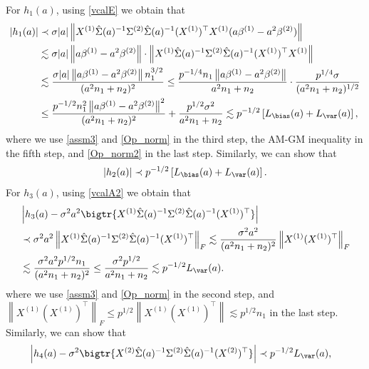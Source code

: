 \documentclass[aos,preprint]{imsart}
\begin{document}
For $h_1(a)$, using \eqref{vcalE} we obtain that 
\begin{align}
	 \left|h_1(a) \right| &\prec  \sigma |a|  \left\|  X^{(1)} \hat \Sigma(a)^{-1} \Sigma^{(2)} \hat \Sigma(a)^{-1} (X^{(1)})^\top X^{(1)} ( a\beta^{(1)}- a^2\beta^{(2)})\right\|  \nonumber\\
&\lesssim  \sigma |a| \left\|   a\beta^{(1)}- a^2\beta^{(2)} \right\|\cdot \left\|  X^{(1)} \hat \Sigma(a)^{-1} \Sigma^{(2)} \hat \Sigma(a)^{-1} (X^{(1)})^\top X^{(1)}  \right\| \nonumber \\
&	\lesssim \frac{\sigma |a| \left\|   a\beta^{(1)}- a^2\beta^{(2)} \right\| n_1^{3/2}}{(a^2 n_1 + n_2)^2} \le \frac{ p^{-1/4} n_1 \left\|   a\beta^{(1)}- a^2\beta^{(2)} \right\|  }{ a^2 n_1 + n_2 }\cdot \frac{p^{1/4} \sigma  }{(a^2 n_1 + n_2)^{1/2}} \nonumber\\ %
&\le \frac{ p^{-1/2} n_1^2 \left\|   a\beta^{(1)}- a^2\beta^{(2)} \right\|^2  }{ (a^2 n_1 + n_2)^2 }+ \frac{p^{1/2}  \sigma^2 }{a^2 n_1 + n_2} \lesssim p^{-1/2} \left[ L_{\bias}(a) + L_{\var}(a)\right],\nonumber
\end{align}
where we use \eqref{assm3} and \eqref{Op_norm}  in the third step, the AM-GM inequality in the 
fifth step, and \eqref{Op_norm2} in the last step. Similarly, we can show that 
\begin{align}
	 \left|h_2(a) \right|  \prec p^{-1/2} \left[ L_{\bias}(a) + L_{\var}(a)\right]. \nonumber
\end{align}
For $h_3(a)$, using \eqref{vcalA2} we obtain that   
\begin{align*}
	 &\left|h_3(a) -\sigma^2 a^2 \bigtr{X^{(1)} \hat \Sigma(a)^{-1} \Sigma^{(2)} \hat \Sigma(a)^{-1}(X^{(1)})^\top } \right| \\ 
	 &\prec  \sigma^2 a^2  \left\| X^{(1)} \hat \Sigma(a)^{-1} \Sigma^{(2)} \hat \Sigma(a)^{-1}(X^{(1)})^\top \right\|_F \lesssim  \frac{\sigma^2 a^2}{(a^2 n_1+ n_2)^2}  \left\| X^{(1)}  (X^{(1)})^\top \right\|_F \\
	 &  \lesssim \frac{\sigma^2 a^2 p^{1/2}n_1}{(a^2 n_1+ n_2)^2}    \le  \frac{\sigma^2  p^{1/2} }{ a^2 n_1+ n_2 } \lesssim    p^{-1/2}   L_{\var}(a).
\end{align*}
where we use \eqref{assm3} and \eqref{Op_norm}  in the second step, and $ \left\| X^{(1)}  (X^{(1)})^\top \right\|_F \le p^{1/2} \left\| X^{(1)}  (X^{(1)})^\top \right\| \lesssim p^{1/2}n_1$ in the last step. Similarly, we can show that  
\begin{align*}
	 &\left|h_4(a) -\sigma^2   \bigtr{X^{(2)} \hat \Sigma(a)^{-1} \Sigma^{(2)} \hat \Sigma(a)^{-1}  (X^{(2)})^\top} \right| \prec   p^{-1/2}   L_{\var}(a), 
\end{align*}
\end{document}
